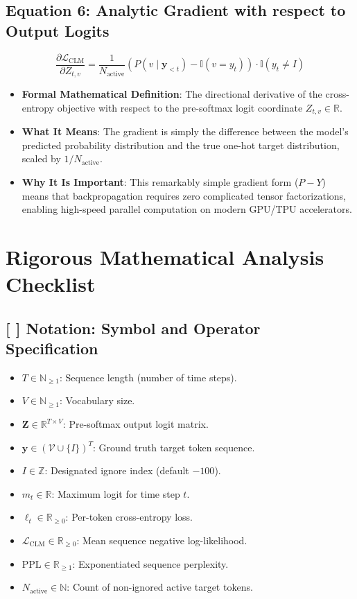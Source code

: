 \documentclass[11pt,a4paper]{article}
\theoremstyle{definition}
\begin{document}
\subsection{\textbf{Equation 6: Analytic Gradient with respect to Output Logits}}
{\boldmath
\begin{equation}
\frac{\partial \mathcal{L}_{\text{CLM}}}{\partial Z_{t, v}} = \frac{1}{N_{\text{active}}} \left( P(v \mid \mathbf{y}_{<t}) - \mathbb{I}(v = y_t) \right) \cdot \mathbb{I}(y_t \ne I)
\end{equation}
}
\begin{itemize}
    \item \textbf{Formal Mathematical Definition}:
    The directional derivative of the cross-entropy objective with respect to the pre-softmax logit coordinate $Z_{t, v} \in \mathbb{R}$.
    \item \textbf{What It Means}:
    The gradient is simply the difference between the model's predicted probability distribution and the true one-hot target distribution, scaled by $1/N_{\text{active}}$.
    \item \textbf{Why It Is Important}:
    This remarkably simple gradient form ($P - Y$) means that backpropagation requires zero complicated tensor factorizations, enabling high-speed parallel computation on modern GPU/TPU accelerators.
\end{itemize}

\section{Rigorous Mathematical Analysis Checklist}

\subsection{[ ] Notation: Symbol and Operator Specification}
\begin{itemize}
    \item $T \in \mathbb{N}_{\ge 1}$: Sequence length (number of time steps).
    \item $V \in \mathbb{N}_{\ge 1}$: Vocabulary size.
    \item $\mathbf{Z} \in \mathbb{R}^{T \times V}$: Pre-softmax output logit matrix.
    \item $\mathbf{y} \in (\mathcal{V} \cup \{I\})^T$: Ground truth target token sequence.
    \item $I \in \mathbb{Z}$: Designated ignore index (default $-100$).
    \item $m_t \in \mathbb{R}$: Maximum logit for time step $t$.
    \item $\ell_t \in \mathbb{R}_{\ge 0}$: Per-token cross-entropy loss.
    \item $\mathcal{L}_{\text{CLM}} \in \mathbb{R}_{\ge 0}$: Mean sequence negative log-likelihood.
    \item $\text{PPL} \in \mathbb{R}_{\ge 1}$: Exponentiated sequence perplexity.
    \item $N_{\text{active}} \in \mathbb{N}$: Count of non-ignored active target tokens.
\end{itemize}
\end{document}
